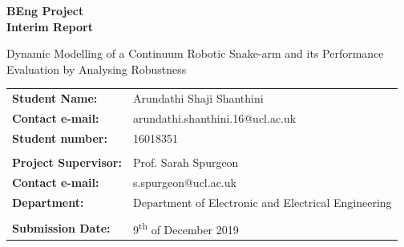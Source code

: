 \documentclass[a4paper,12pt]{report}
\author{Arundathi Shaji Shanthini}
\begin{document}
\begin{titlepage}
    \setlength{\voffset}{-1.8in}
    \noindent \noindent {}
    
    \vspace{30mm}

    \begin{center}
        {\LARGE \textbf{BEng Project}}\\
        \vspace{4mm}
        {\Huge \textbf{Interim Report}}
    \end{center}
    
    \vspace{10mm}
    
    \begin{center}
    \begin{spacing}{1.8}
    {\LARGE
   Dynamic Modelling of a Continuum Robotic Snake-arm and its Performance Evaluation by Analysing Robustness}
    \end{spacing}
    \end{center}
    
    \vspace{18mm}
    
     \begin{tabular}{ll}
        \textbf{Student Name:}  & \hspace{4mm} Arundathi Shaji Shanthini \\
       \textbf{Contact e-mail:} & \hspace{4mm} arundathi.shanthini.16@ucl.ac.uk \\
        \textbf{Student number:} & \hspace{4mm} 16018351 \\ \\ 
        \textbf{Project Supervisor:}  & \hspace{4mm} Prof. Sarah Spurgeon \\
        \textbf{Contact e-mail:}  & \hspace{4mm} s.spurgeon@ucl.ac.uk \\
         \textbf{Department:} & \hspace{4mm} Department of Electronic and Electrical Engineering\\ \\ 
          \textbf{Submission Date:} & \hspace{4mm} 9\textsuperscript{th} of December 2019
    \end{tabular}
\end{titlepage}
\end{document}
